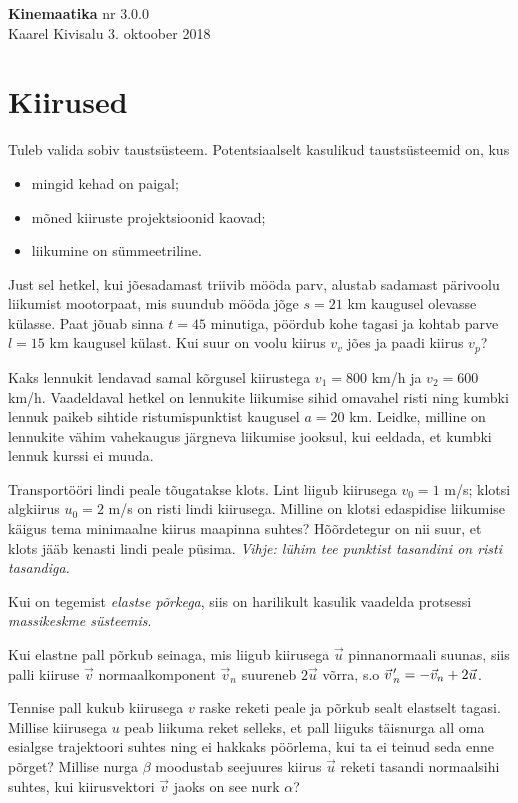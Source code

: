 \documentclass[a4paper,11pt,twocolumn]{article}
\begin{document}
{\huge \textbf{Kinemaatika} \hfill \normalsize {nr 3.0.0}} \\
{Kaarel Kivisalu \hfill 3. oktoober 2018}

\section{Kiirused}
Tuleb valida sobiv taustsüsteem. Potentsiaalselt kasulikud taustsüsteemid on, kus
{\setlength{\parskip}{0em}
\begin{itemize}[noitemsep,nolistsep]
	\item mingid kehad on paigal;
	\item mõned kiiruste projektsioonid kaovad;
	\item liikumine on sümmeetriline.
\end{itemize}}
\begin{question}[Piirk 2015, P2]
	Just sel hetkel, kui jõesadamast triivib mööda parv, alustab sadamast pärivoolu liikumist mootorpaat, mis suundub mööda jõge $ s = 21 $ km kaugusel olevasse külasse. Paat jõuab sinna $ t = 45 $ minutiga, pöördub kohe tagasi ja kohtab parve $ l=15 $ km kaugusel külast. Kui suur on voolu kiirus $ v_v $ jões ja paadi kiirus $ v_p $?
\end{question}
\begin{question}[Piirk 2014, P9][kin1][4.4cm]
	Kaks lennukit lendavad samal kõrgusel kiirustega $ v_1 = 800 $ km/h ja $ v_2 = 600 $ km/h. Vaadeldaval hetkel on lennukite liikumise sihid omavahel risti ning kumbki lennuk paikeb sihtide ristumispunktist kaugusel $ a = 20 $ km. Leidke, milline on lennukite vähim vahekaugus järgneva liikumise jooksul, kui eeldada, et kumbki lennuk kurssi ei muuda.
\end{question}
\begin{question}
	Transportööri lindi peale tõugatakse klots. Lint liigub kiirusega $ v_0= 1 $ m/s; klotsi algkiirus $ u_0= 2 $ m/s on risti lindi kiirusega. Milline on klotsi edaspidise liikumise käigus tema minimaalne kiirus maapinna suhtes? Hõõrdetegur on nii suur, et klots jääb kenasti lindi peale püsima. \textit{Vihje: lühim tee punktist tasandini on risti tasandiga.}
\end{question}
Kui on tegemist \textit{elastse põrkega}, siis on harilikult kasulik vaadelda protsessi \textit{massikeskme süsteemis}.

Kui elastne pall põrkub seinaga, mis liigub kiirusega $ \vec{u} $ pinnanormaali suunas, siis palli kiiruse $ \vec{v} $ normaalkomponent $ \vec{v}_n $ suureneb $ 2\vec{u} $ võrra, s.o $\pvec{v}'_n=-\vec{v}_n+2\vec{u} $.
\begin{question}[NSVL ol. 1983, 9. kl]
	Tennise pall kukub kiirusega $ v $ raske reketi peale ja põrkub sealt elastselt tagasi. Millise kiirusega $ u $ peab liikuma reket selleks, et pall liiguks täisnurga all oma esialgse trajektoori suhtes ning ei hakkaks pöörlema, kui ta ei teinud seda enne põrget? Millise nurga $ \beta $ moodustab seejuures kiirus $ \vec{u} $ reketi tasandi normaalsihi suhtes, kui kiirusvektori $ \vec{v} $ jaoks on see nurk $ \alpha $?
\end{question}
\end{document}
